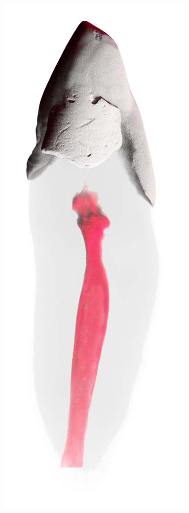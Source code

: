 \begin{frame}
\begin{frame}
		\includegraphics[height=\imageheight]{./images/rcs/Tooth0752}%

\end{frame}
\end{frame}
